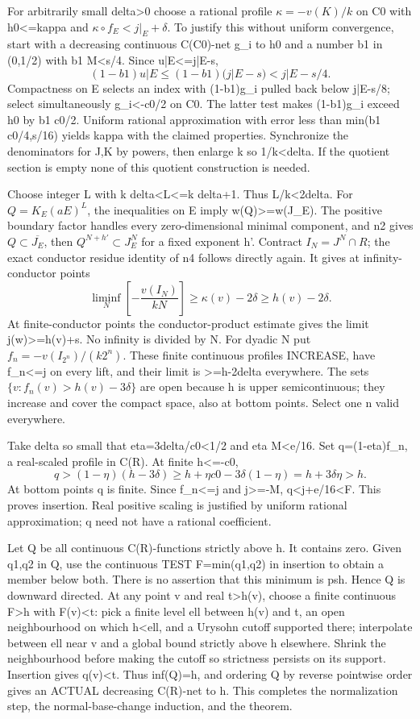 \documentclass[11pt]{article}
\begin{document}
For arbitrarily small delta>0 choose a rational profile \(\kappa=-v(K)/k\) on C0 with h0<=kappa and \(\kappa\circ f_E<j|_E+\delta\). To justify this without uniform convergence, start with a decreasing continuous C(C0)-net g\_i to h0 and a number b1 in (0,1/2) with b1 M<s/4. Since u|E<=j|E-s,
\[
 (1-b1)u|E\le(1-b1)(j|E-s)<j|E-s/4.
\]
Compactness on E selects an index with (1-b1)g\_i pulled back below j|E-s/8; select simultaneously g\_i<-c0/2 on C0. The latter test makes (1-b1)g\_i exceed h0 by b1 c0/2. Uniform rational approximation with error less than min(b1 c0/4,s/16) yields kappa with the claimed properties. Synchronize the denominators for J,K by powers, then enlarge k so 1/k<delta. If the quotient section is empty none of this quotient construction is needed.

Choose integer L with k delta<L<=k delta+1. Thus L/k<2delta. For \(Q=K_E(aE)^L\), the inequalities on E imply w(Q)>=w(J\_E). The positive boundary factor handles every zero-dimensional minimal component, and n2 gives \(Q\subset\overline{J_E}\), then \(Q^{N+h'}\subset J_E^N\) for a fixed exponent h'. Contract \(I_N=J^N\cap R\); the exact conductor residue identity of n4 follows directly again. It gives at infinity-conductor points
\[
 \liminf_N\left[-\frac{v(I_N)}{kN}\right]\ge\kappa(v)-2\delta\ge h(v)-2\delta.
\]
At finite-conductor points the conductor-product estimate gives the limit j(w)>=h(v)+s. No infinity is divided by N. For dyadic N put \(f_n=-v(I_{2^n})/(k2^n)\). These finite continuous profiles INCREASE, have f\_n<=j on every lift, and their limit is >=h-2delta everywhere. The sets \(\{v:f_n(v)>h(v)-3\delta\}\) are open because h is upper semicontinuous; they increase and cover the compact space, also at bottom points. Select one n valid everywhere.

Take delta so small that eta=3delta/c0<1/2 and eta M<e/16. Set q=(1-eta)f\_n, a real-scaled profile in C(R). At finite h<=-c0,
\[
 q>(1-\eta)(h-3\delta)
   \ge h+\eta c0-3\delta(1-\eta)=h+3\delta\eta>h.
\]
At bottom points q is finite. Since f\_n<=j and j>=-M, q<j+e/16<F. This proves insertion. Real positive scaling is justified by uniform rational approximation; q need not have a rational coefficient.

Let Q be all continuous C(R)-functions strictly above h. It contains zero. Given q1,q2 in Q, use the continuous TEST F=min(q1,q2) in insertion to obtain a member below both. There is no assertion that this minimum is psh. Hence Q is downward directed. At any point v and real t>h(v), choose a finite continuous F>h with F(v)<t: pick a finite level ell between h(v) and t, an open neighbourhood on which h<ell, and a Urysohn cutoff supported there; interpolate between ell near v and a global bound strictly above h elsewhere. Shrink the neighbourhood before making the cutoff so strictness persists on its support. Insertion gives q(v)<t. Thus inf(Q)=h, and ordering Q by reverse pointwise order gives an ACTUAL decreasing C(R)-net to h. This completes the normalization step, the normal-base-change induction, and the theorem.
\end{document}

